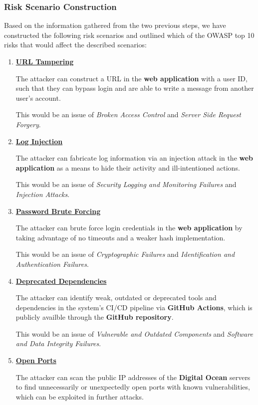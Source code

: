 \subsubsection{Risk Scenario Construction}
Based on the information gathered from the two previous steps, we have constructed the following risk scenarios and outlined which of the OWASP top 10 risks that would affect the described scenarios:
\begin{enumerate}
    \item \textbf{\underline{URL Tampering}}

    The attacker can construct a URL in the \textbf{web application} with a user ID, such that they can bypass login and are able to write a message from another user’s account.

    This would be an issue of \textit{Broken Access Control} and \textit{Server Side Request Forgery}.
    \item \textbf{\underline{Log Injection}}

    The attacker can fabricate log information via an injection attack in the \textbf{web application} as a means to hide their activity and ill-intentioned actions.

    This would be an issue of \textit{Security Logging and Monitoring Failures} and \textit{Injection Attacks}.
    \item \textbf{\underline{Password Brute Forcing}}

    The attacker can brute force login credentials in the \textbf{web application} by taking advantage of no timeouts and a weaker hash implementation.

    This would be an issue of \textit{Cryptographic Failures} and \textit{Identification and Authentication Failures}.
    \item \textbf{\underline{Deprecated Dependencies}}

    The attacker can identify weak, outdated or deprecated tools and dependencies in the system's CI/CD pipeline via \textbf{GitHub Actions}, which is publicly availble through the \textbf{GitHub repository}.

    This would be an issue of \textit{Vulnerable and Outdated Components} and \textit{Software and Data Integrity Failures}.
    \item \textbf{\underline{Open Ports}}

    The attacker can scan the public IP addresses of the \textbf{Digital Ocean} servers to find unnecessarily or unexpectedly open ports with known vulnerabilities, which can be exploited in further attacks.


\end{enumerate}
